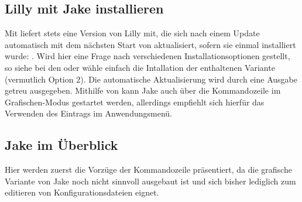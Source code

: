 \subsection{Lilly mit Jake installieren}
Mit  liefert \Jake stets eine Version von Lilly mit, die sich nach einem Update automatisch mit dem nächsten Start von \Jake aktualisiert, sofern sie einmal installiert wurde: . Wird hier eine Frage nach verschiedenen Installationsoptionen gestellt, so siehe bei den  oder wähle einfach die Intallation der enthaltenen Variante (vermutlich Option $2$). Die automatische Aktualisierung wird durch eine Ausgabe getreu  ausgegeben. Mithilfe von  kann Jake auch über die Kommandozeile im Grafischen-Modus gestartet werden, allerdings empfiehlt sich hierfür das Verwenden des Eintrags im Anwendungsmenü. 

\subsection{Jake im Überblick}
Hier werden zuerst die Vorzüge der Kommandozeile präsentiert, da die grafische Variante von Jake noch nicht sinnvoll ausgebaut ist und sich bisher lediglich zum editieren von Konfigurationsdateien eignet.
